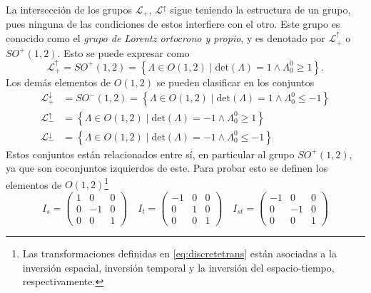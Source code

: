 La intersección de los grupos $\mathcal{L}_+$, $\mathcal{L}^{\uparrow}$ sigue teniendo la estructura de un grupo, pues ninguna de las condiciones de estos interfiere con el otro. Este grupo es conocido como el \emph{grupo de Lorentz ortocrono y propio}, y es denotado por $\mathcal{L}_+^{\uparrow}$ o $SO^+(1,2)$. Esto se puede expresar como
\begin{equation}
	\mathcal{L}_+^{\uparrow} = SO^+(1,2) = \left\{\Lambda \in O(1,2) \mid \text{det}(\Lambda) = 1 \wedge\Lambda_0^0\geq 1\right\}.
\end{equation}
Los demás elementos de $O(1,2)$ se pueden clasificar en los conjuntos
\begin{align}
	\mathcal{L}_+^{\downarrow} & = SO^-(1,2) = \left\{\Lambda \in O(1,2)\mid \text{det}(\Lambda) = 1\wedge \Lambda_0^0\leq -1\right\} \\
	\mathcal{L}_-^{\uparrow}   & = \left\{\Lambda \in O(1,2)\mid \text{det}(\Lambda) = -1\wedge \Lambda_0^0\geq 1\right\}             \\
	\mathcal{L}_-^{\downarrow} & = \left\{\Lambda \in O(1,2)\mid \text{det}(\Lambda) = -1\wedge \Lambda_0^0\leq -1\right\}
\end{align}
Estos conjuntos están relacionados entre sí, en particular al grupo $SO^+(1,2)$, ya que son coconjuntos izquierdos de este. Para probar esto se definen los elementos de $O(1,2)$\footnote{Las transformaciones definidas en \eqref{eq:discretetrans} están asociadas a la inversión espacial, inversión temporal y la inversión del espacio-tiempo, respectivamente.}
\begin{equation}
	I_s = \begin{pmatrix}
		1 & 0  & 0 \\
		0 & -1 & 0 \\
		0 & 0  & 1
	\end{pmatrix}\quad I_t = \begin{pmatrix}
		-1 & 0 & 0 \\
		0  & 1 & 0 \\
		0  & 0 & 1
	\end{pmatrix}\quad I_{st} = \begin{pmatrix}
		-1 & 0  & 0 \\
		0  & -1 & 0 \\
		0  & 0  & 1
	\end{pmatrix}\label{eq:discretetrans}
\end{equation}
